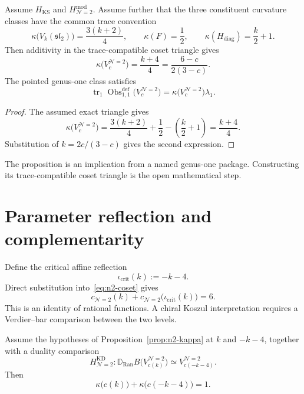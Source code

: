 \begin{proposition}[Conditional modular characteristic of the
$\mathcal N=2$ coset; \ClaimStatusConditional]
\label{prop:n2-kappa}
Assume $H_{\mathrm{KS}}$ and
$H_{\mathcal N=2}^{\mathrm{mod}}$.  Assume further that the three
constituent curvature classes have the common trace convention
\[
 \kappa\bigl(V_k(\mathfrak{sl}_2)\bigr)=\frac{3(k+2)}4,
 \qquad
 \kappa(F)=\frac12,
 \qquad
 \kappa(H_{\mathrm{diag}})=\frac{k}{2}+1.
\]
Then additivity in the trace-compatible coset triangle gives
\begin{equation}\label{eq:n2-sca-kappa}
 \kappa\bigl(V_c^{\mathcal N=2}\bigr)
 =\frac{k+4}{4}
 =\frac{6-c}{2(3-c)}.
\end{equation}
The pointed genus-one class satisfies
\[
 \operatorname{tr}_1
 \operatorname{Obs}^{\mathrm{def}}_{1,1}
 \bigl(V_c^{\mathcal N=2}\bigr)
 =\kappa\bigl(V_c^{\mathcal N=2}\bigr)\lambda_1.
\]
\end{proposition}

\begin{proof}
The assumed exact triangle gives
\[
 \kappa\bigl(V_c^{\mathcal N=2}\bigr)
 =\frac{3(k+2)}4+\frac12-\left(\frac{k}{2}+1\right)
 =\frac{k+4}{4}.
\]
Substitution of $k=2c/(3-c)$ gives the second expression.
\end{proof}

The proposition is an implication from a named genus-one package.
Constructing its trace-compatible coset triangle is the open
mathematical step.

\section{Parameter reflection and complementarity}

Define the critical affine reflection
\[
 \iota_{\mathrm{crit}}(k):=-k-4.
\]
Direct substitution into~\eqref{eq:n2-coset} gives
\[
 c_{\mathcal N=2}(k)+
 c_{\mathcal N=2}\bigl(\iota_{\mathrm{crit}}(k)\bigr)=6.
\]
This is an identity of rational functions.  A chiral Koszul
interpretation requires a Verdier--bar comparison between the two
levels.

\begin{proposition}[Conditional $\mathcal N=2$ complementarity;
\ClaimStatusConditional]
\label{prop:n2-complementarity}
Assume the hypotheses of Proposition~\ref{prop:n2-kappa} at $k$ and
$-k-4$, together with a duality comparison
\[
 H_{\mathcal N=2}^{\mathrm{KD}}\colon
 \mathbb D_{\operatorname{Ran}}B
 \bigl(V_{c(k)}^{\mathcal N=2}\bigr)
 \simeq V_{c(-k-4)}^{\mathcal N=2}.
\]
Then
\begin{equation}\label{eq:n2-sca-complementarity-sum}
 \kappa\bigl(c(k)\bigr)+\kappa\bigl(c(-k-4)\bigr)=1.
\end{equation}
\end{proposition}

